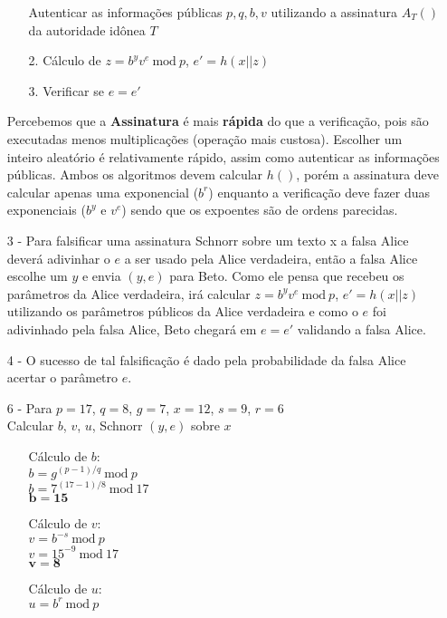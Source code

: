 \documentclass[12pt]{article}
\newcommand{\modd}{\ \text{mod}\ }
\begin{document}
\begin{itemize}
\begin{itemize}
							Autenticar as informações públicas $p, q, b, v$ utilizando
							a assinatura $A_T()$ da autoridade idônea $T$
						\item[2.]
							Cálculo de $z = b^yv^e \modd p$, $e' = h(x||z)$
						\item[3.]
							Verificar se $e = e'$	
					\end{itemize}		
				Percebemos que a \textbf{Assinatura} é mais \textbf{rápida} do que a
				verificação, pois são executadas menos multiplicações (operação mais
				custosa).  Escolher um inteiro aleatório é relativamente rápido, assim
				como autenticar as informações públicas. Ambos os algoritmos devem
				calcular $h()$, porém a assinatura deve calcular apenas uma 
				exponencial ($b^r$) enquanto a verificação deve fazer duas
				exponenciais ($b^y$ e $v^e$) sendo que os expoentes são de
				ordens parecidas.
			\item[3 -]
				Para falsificar uma assinatura Schnorr sobre um texto x a falsa
				Alice deverá adivinhar o $e$ a ser usado pela Alice verdadeira,
				então a falsa Alice escolhe um $y$ e envia $(y, e)$ para Beto.
				Como ele pensa que recebeu os parâmetros da Alice verdadeira,
				irá calcular $z = b^yv^e \modd p$, $e' = h(x||z)$ utilizando
				os parâmetros públicos da Alice verdadeira e como o $e$ foi
				adivinhado pela falsa Alice, Beto chegará em $e = e'$ validando
				a falsa Alice.
			\item[4 -]
				O sucesso de tal falsificação é dado pela probabilidade da falsa
				Alice acertar o parâmetro $e$.
			\item[6 -]
				Para $p = 17$, $q = 8$, $g = 7$, $x = 12$, $s = 9$, $r = 6$\\
				Calcular	 $b$, $v$, $u$, Schnorr $(y, e)$ sobre $x$
				\begin{itemize}
					\item[]
						Cálculo de $b$:\\
						$b = g^{(p-1)/q} \modd p$\\
						$b = 7^{(17-1)/8} \modd 17$\\
						$\mathbf{b = 15}$
					\item[]
						Cálculo de $v$:\\
						$v = b^{-s} \modd p$\\
						$v = 15^{-9} \modd 17$\\
						$\mathbf{v = 8}$
					\item[]
						Cálculo de $u$:\\
						$u = b^r \modd p$\\

\end{itemize}
\end{itemize}
\end{document}
